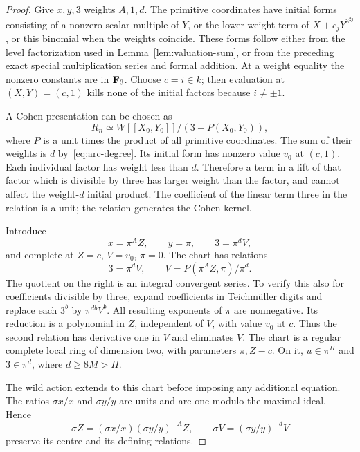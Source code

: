 \begin{proof}
Give $x,y,3$ weights $A,1,d$. The primitive coordinates have initial forms consisting of a nonzero scalar multiple of $Y$, or the lower-weight term of $X+c_jY^{3^{2j}}$, or this binomial when the weights coincide. These forms follow either from the level factorization used in Lemma~\ref{lem:valuation-sum}, or from the preceding exact special multiplication series and formal addition. At a weight equality the nonzero constants are in $\mathbf F_3$. Choose $c=i\in k$; then evaluation at $(X,Y)=(c,1)$ kills none of the initial factors because $i\ne\pm1$.

A Cohen presentation can be chosen as
\begin{equation}\label{eq:cohen-relation}
 R_n\simeq W[[X_0,Y_0]]/(3-P(X_0,Y_0)),
\end{equation}
where $P$ is a unit times the product of all primitive coordinates. The sum of their weights is $d$ by~\eqref{eq:arc-degree}. Its initial form has nonzero value $v_0$ at $(c,1)$. Each individual factor has weight less than $d$. Therefore a term in a lift of that factor which is divisible by three has larger weight than the factor, and cannot affect the weight-$d$ initial product. The coefficient of the linear term three in the relation is a unit; the relation generates the Cohen kernel.

Introduce
\[
 x=\pi^A Z,\qquad y=\pi,\qquad3=\pi^d V,
\]
and complete at $Z=c$, $V=v_0$, $\pi=0$. The chart has relations
\begin{equation}\label{eq:chart-relations}
 3=\pi^d V,\qquad V=P(\pi^A Z,\pi)/\pi^d.
\end{equation}
The quotient on the right is an integral convergent series. To verify this also for coefficients divisible by three, expand coefficients in Teichm\"uller digits and replace each $3^b$ by $\pi^{db}V^b$. All resulting exponents of $\pi$ are nonnegative. Its reduction is a polynomial in $Z$, independent of $V$, with value $v_0$ at $c$. Thus the second relation has derivative one in $V$ and eliminates $V$. The chart is a regular complete local ring of dimension two, with parameters $\pi,Z-c$. On it, $u\in\pi^H$ and $3\in\pi^d$, where $d\ge8M>H$.

The wild action extends to this chart before imposing any additional equation. The ratios $\sigma x/x$ and $\sigma y/y$ are units and are one modulo the maximal ideal. Hence
\[
 \sigma Z=(\sigma x/x)(\sigma y/y)^{-A}Z,\qquad
 \sigma V=(\sigma y/y)^{-d}V
\]
preserve its centre and its defining relations.


\end{proof}
